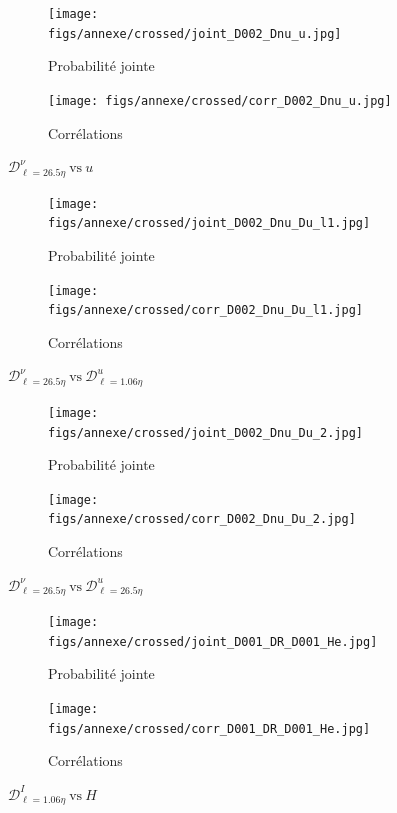 \documentclass[13pt, a4paper]{extarticle}
\begin{document}
\begin{figure}[H]
  \centering
  \begin{subfigure}[b]{0.48\linewidth}
  \centering
  \texttt{[image: figs/annexe/crossed/joint\_D002\_Dnu\_u.jpg]}
  \caption{Probabilité jointe}
  \end{subfigure}
  \begin{subfigure}[b]{0.48\linewidth}
    \centering
    \texttt{[image: figs/annexe/crossed/corr\_D002\_Dnu\_u.jpg]}
    \caption{Corrélations}
    \end{subfigure}
    \caption{$\mathscr{D}^\nu_{\ell=26.5\eta}~\text{vs}~u$}
\end{figure}

\begin{figure}[H]
  \centering
  \begin{subfigure}[b]{0.48\linewidth}
  \centering
  \texttt{[image: figs/annexe/crossed/joint\_D002\_Dnu\_Du\_l1.jpg]}
  \caption{Probabilité jointe}
  \end{subfigure}
  \begin{subfigure}[b]{0.48\linewidth}
    \centering
    \texttt{[image: figs/annexe/crossed/corr\_D002\_Dnu\_Du\_l1.jpg]}
    \caption{Corrélations}
    \end{subfigure}
    \caption{$\mathscr{D}^\nu_{\ell=26.5\eta}~\text{vs}~\mathscr{D}^u_{\ell=1.06\eta}$}
\end{figure}

\begin{figure}[H]
  \centering
  \begin{subfigure}[b]{0.48\linewidth}
  \centering
  \texttt{[image: figs/annexe/crossed/joint\_D002\_Dnu\_Du\_2.jpg]}
  \caption{Probabilité jointe}
  \end{subfigure}
  \begin{subfigure}[b]{0.48\linewidth}
    \centering
    \texttt{[image: figs/annexe/crossed/corr\_D002\_Dnu\_Du\_2.jpg]}
    \caption{Corrélations}
    \end{subfigure}
    \caption{$\mathscr{D}^\nu_{\ell=26.5\eta}~\text{vs}~\mathscr{D}^u_{\ell=26.5\eta}$}
\end{figure}

\begin{figure}[H]
  \centering
  \begin{subfigure}[b]{0.48\linewidth}
  \centering
  \texttt{[image: figs/annexe/crossed/joint\_D001\_DR\_D001\_He.jpg]}
  \caption{Probabilité jointe}
  \end{subfigure}
  \begin{subfigure}[b]{0.48\linewidth}
    \centering
    \texttt{[image: figs/annexe/crossed/corr\_D001\_DR\_D001\_He.jpg]}
    \caption{Corrélations}
    \end{subfigure}
    \caption{$\mathscr{D}^I_{\ell=1.06\eta}~\text{vs}~H$}
\end{figure}
\end{document}
